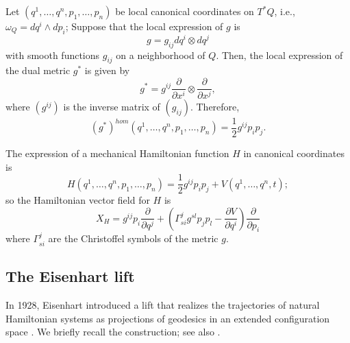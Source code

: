 \documentclass[10pt,a4paper]{article}
\begin{document}
Let $(q^{1},\ldots,q^{n},p_{1},\ldots, p_{n})$ be local canonical coordinates on $T^{*}Q$, i.e., $\omega_Q=dq^{i}\wedge dp_{i}$; Suppose that the local expression of $g$ is 
$$g=g_{ij}dq^{i}\otimes dq^{j}$$
with smooth functions $g_{ij}$ on a neighborhood of $Q.$ Then,  the local expression of the dual metric $g^*$ is given by 
\begin{equation*}
g^{*}=g^{ij}\frac{\partial}{\partial x^{i}}\otimes\frac{\partial}{\partial x^{j}},
\end{equation*}
where $(g^{ij})$ is the inverse matrix of $(g_{ij})$. 
Therefore, 
\begin{equation*}
(g^{*})^{hom}(q^{1},\ldots,q^{n},p_{1},\ldots, p_{n})=\frac{1}{2}g^{ij}p_{i}p_{j}.
\end{equation*}

The expression of a mechanical Hamiltonian function $H$ in canonical coordinates is
\begin{equation*}
H(q^{1},\ldots,q^{n},p_{1},\ldots, p_{n})=\frac{1}{2}g^{ij}p_{i}p_{j}+V(q^{1},\ldots,q^{n},t);
\end{equation*}
so the Hamiltonian vector field for $H$ is 
\begin{equation*}\label{hamiltonian}
X_H=g^{ij}p_i\frac{\partial }{\partial q^{j}} + (\Gamma_{si}^jg^{sl}p_jp_l-\frac{\partial V}{\partial q^i})\frac{\partial }{\partial p_i}
\end{equation*}
where $\Gamma_{si}^j$ are the Christoffel symbols of the metric $g$. 



\subsection{The Eisenhart lift}
In 1928, Eisenhart introduced a lift that realizes the trajectories of natural Hamiltonian systems as projections of geodesics in an extended configuration space \cite{eisenhart1928dynamical}. We briefly recall the construction; see also \cite{szydlowski1998eisenhart,cariglia2015eisenhart,carinena2017superintegrable}.
\end{document}
